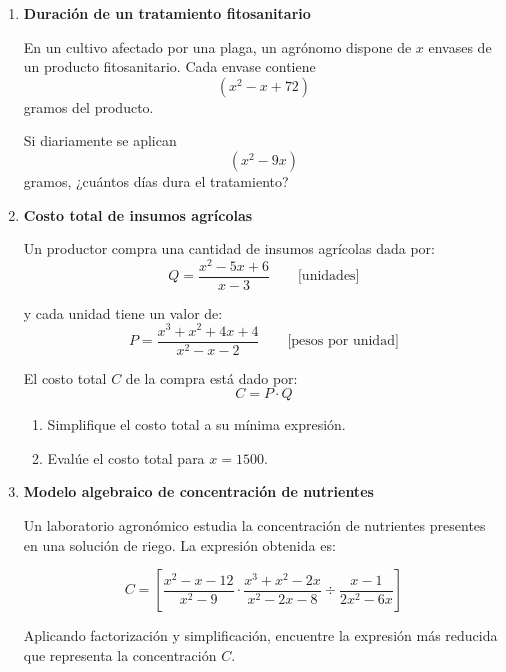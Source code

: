 \documentclass[12pt]{article}
\begin{document}
\begin{enumerate}
		Determine la cantidad total de fertilizante, en mL, que se debe utilizar.
		
		\vspace{0.4cm}
		
		\item \textbf{Duración de un tratamiento fitosanitario}
		
		En un cultivo afectado por una plaga, un agrónomo dispone de \(x\) envases de un producto fitosanitario. Cada envase contiene
		\[
		(x^2-x+72)
		\]
		gramos del producto.
		
		Si diariamente se aplican
		\[
		(x^2-9x)
		\]
		gramos, ¿cuántos días dura el tratamiento?
		
		\vspace{0.4cm}
		
		\item \textbf{Costo total de insumos agrícolas}
		
		Un productor compra una cantidad de insumos agrícolas dada por:
		\[
		Q=\frac{x^2-5x+6}{x-3}
		\qquad \text{[unidades]}
		\]
		
		y cada unidad tiene un valor de:
		\[
		P=\frac{x^3+x^2+4x+4}{x^2-x-2}
		\qquad \text{[pesos por unidad]}
		\]
		
		El costo total \(C\) de la compra está dado por:
		\[
		C=P\cdot Q
		\]
		
		\begin{enumerate}[label=\alph*)]
			\item Simplifique el costo total a su mínima expresión.
			\item Evalúe el costo total para \(x=1500\).
		\end{enumerate}
		
		\vspace{0.4cm}
		
		\item \textbf{Modelo algebraico de concentración de nutrientes}
		
		Un laboratorio agronómico estudia la concentración de nutrientes presentes en una solución de riego. La expresión obtenida es:
		
		\[
		C=
		\left[
		\frac{x^2-x-12}{x^2-9}
		\cdot
		\frac{x^3+x^2-2x}{x^2-2x-8}
		\div
		\frac{x-1}{2x^2-6x}
		\right]
		\]
		
		Aplicando factorización y simplificación, encuentre la expresión más reducida que representa la concentración \(C\).
		

\end{enumerate}
\end{document}
